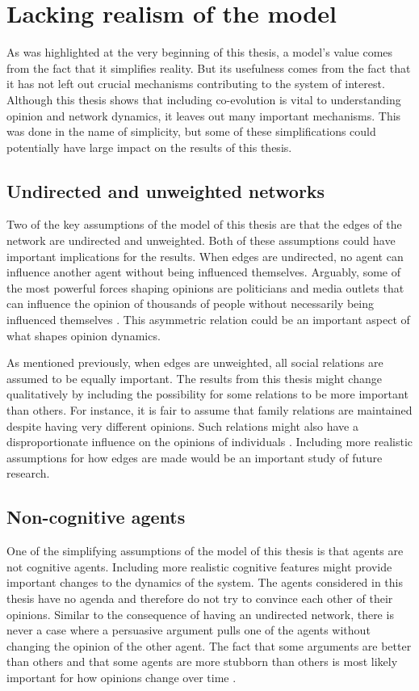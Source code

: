 \documentclass[11pt]{article}
\begin{document}
\section{Lacking realism of the model}
As was highlighted at the very beginning of this thesis, a model's value comes from the fact that it simplifies reality. But its usefulness comes from the fact that it has not left out crucial mechanisms contributing to the system of interest. Although this thesis shows that including co-evolution is vital to understanding opinion and network dynamics, it leaves out many important mechanisms. This was done in the name of simplicity, but some of these simplifications could potentially have large impact on the results of this thesis. 

\subsection{Undirected and unweighted networks}
Two of the key assumptions of the model of this thesis are that the edges of the network are undirected and unweighted. Both of these assumptions could have important implications for the results. When edges are undirected, no agent can influence another agent without being influenced themselves. Arguably, some of the most powerful forces shaping opinions are politicians and media outlets that can influence the opinion of thousands of people without necessarily being influenced themselves \cite{wilson_polarization_2020}. This asymmetric relation could be an important aspect of what shapes opinion dynamics. 

As mentioned previously, when edges are unweighted, all social relations are assumed to be equally important. The results from this thesis might change qualitatively by including the possibility for some relations to be more important than others. For instance, it is fair to assume that family relations are maintained despite having very different opinions. Such relations might also have a disproportionate influence on the opinions of individuals \cite{burg1994families}. Including more realistic assumptions for how edges are made would be an important study of future research.

\subsection{Non-cognitive agents}
One of the simplifying assumptions of the model of this thesis is that agents are not cognitive agents. Including more realistic cognitive features might provide important changes to the dynamics of the system. The agents considered in this thesis have no agenda and therefore do not try to convince each other of their opinions. Similar to the consequence of having an undirected network, there is never a case where a persuasive argument pulls one of the agents without changing the opinion of the other agent. The fact that some arguments are better than others and that some agents are more stubborn than others is most likely important for how opinions change over time \cite{flache_models_2017,ghaderi_opinion_2014,yildiz_binary_2013}.
\end{document}
